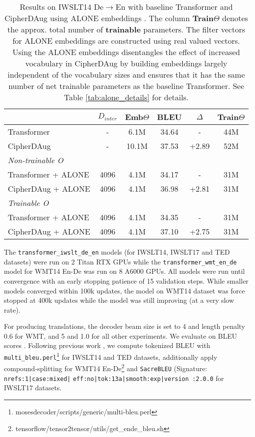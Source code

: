 \documentclass[11pt]{article}
\begin{document}
\begin{table*}[ht]
\small
\centering
\begin{tabular}{lcc|cc|c}
\toprule
 & \textbf{$D_{inter}$} & \textbf{Emb$\Theta$} & \textbf{BLEU} & \textbf{$\Delta$} & \textbf{Train$\Theta$} \\ \midrule
Transformer & - & 6.1M & 34.64 & - & 44M \\
CipherDAug & - & 10.1M & 37.53 & +2.89 & 52M \\
\midrule
\scriptsize{\quad \emph{Non-trainable O}} & & & & & \\ 
Transformer + ALONE & 4096 & 4.1M & 34.17 & - & 31M \\
CipherDAug + ALONE & 4096 & 4.1M & 36.98 & +2.81 & 31M \\ 
\midrule
\scriptsize{\quad \emph{Trainable O}} & & & & & \\ 
Transformer + ALONE & 4096 & 4.1M & 34.35 & - & 31M \\
CipherDAug + ALONE & 4096 & 4.1M & 37.10 & +2.75 & 31M \\
\bottomrule
\end{tabular}
\caption{Results on IWSLT14 De$\rightarrow$En with baseline Transformer and CipherDAug using ALONE embeddings \cite{alone-neurips20}. The column \textbf{Train$\Theta$} denotes the approx. total number of \textbf{trainable} parameters. The filter vectors for ALONE embeddings are constructed using real valued vectors. Using the ALONE embeddings disentangles the effect of increased vocabulary in CipherDAug by building embeddings largely independent of the vocabulary sizes and ensures that it has the same number of net trainable parameters as the baseline Transformer. See Table \ref{tab:alone_details} for details.}
\label{tab:alone}
\end{table*}


The \texttt{transformer\_iwslt\_de\_en} models (for IWSLT14, IWSLT17 and TED datasets) were run on 2 Titan RTX GPUs while the \texttt{transformer\_wmt\_en\_de} model for WMT14 En-De was run on 8 A6000 GPUs. All models were run until convergence with an early stopping patience of 15 validation steps. While smaller models converged within 100k updates, the model on WMT14 dataset was force stopped at 400k updates while the model was still improving (at a very slow rate). 

For producing translations, the decoder beam size is set to 4 and length penalty 0.6 for WMT, and 5 and 1.0 for all other experiments. We evaluate on BLEU scores \cite{papineni-etal-2002-bleu}. Following previous work \cite{vaswani2017attention,nguyen19datadiverse, xu2021bert}, we compute tokenized BLEU with \texttt{multi\_bleu.perl}\footnote{mosesdecoder/scripts/generic/multi-bleu.perl} for IWSLT14 and TED datasets, additionally apply compound-splitting for WMT14 En-De\footnote{tensorflow/tensor2tensor/utils/get\_ende\_bleu.sh} and \texttt{SacreBLEU} \cite{post-2018-call} (Signature: \texttt{nrefs:1|case:mixed|} \texttt{eff:no|tok:13a|smooth:exp|version :2.0.0}  for IWSLT17 datasets. 
\end{document}

